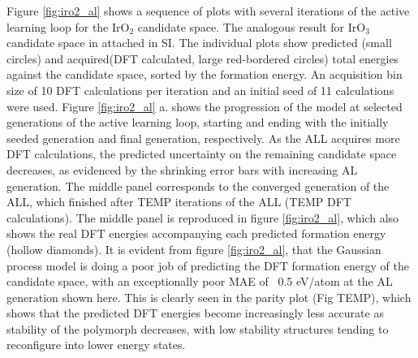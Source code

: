 %
Figure \ref{fig:iro2_al} shows a sequence of  plots with several iterations of the active learning loop for the IrO$_2$ candidate space. The analogous result for IrO$_3$ candidate space in attached in SI.  The individual plots show predicted (small circles) and acquired(DFT calculated, large red-bordered circles) total energies against the candidate space, sorted by the formation energy.  An acquisition bin size of 10 DFT calculations per iteration and an initial seed of 11 calculations were used.
%
Figure \ref{fig:iro2_al} a. shows the progression of the model at selected generations of the active learning loop, starting and ending with the initially seeded generation and final generation, respectively.
%
As the ALL acquires more DFT calculations, the predicted uncertainty on the remaining candidate space decreases,
as evidenced by the shrinking error bars with increasing AL generation.
%
The middle panel corresponds to the converged generation of the ALL, which finished after TEMP iterations of the ALL (TEMP DFT calculations).
%
The middle panel is reproduced in figure \ref{fig:iro2_al}, which also shows the real DFT energies accompanying each predicted formation energy (hollow diamonds).
%
It is evident from figure \ref{fig:iro2_al}, that the Gaussian process model is doing a poor job of predicting the DFT formation energy of the candidate space, with an exceptionally poor MAE of ~0.5 eV/atom at the AL generation shown here.
%
This is clearly seen in the parity plot (Fig TEMP), which shows that the predicted DFT energies become increasingly less accurate as stability of the polymorph decreases, with low stability structures tending to reconfigure into lower energy states.

